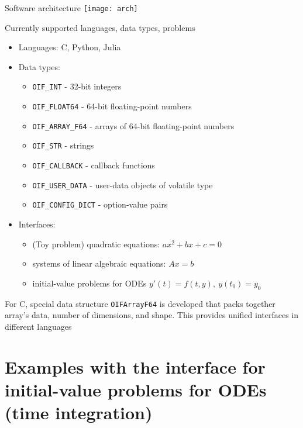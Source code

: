 \documentclass[10pt, aspectratio=169, progressbar=frametitle]{beamer}
\begin{document}
\begin{frame}{Software architecture}
  \centering
  \texttt{[image: arch]}
\end{frame}

\begin{frame}{Currently supported languages, data types, problems}
  \begin{itemize}
    \item Languages: C, Python, Julia
    \item Data types:
          \begin{itemize}
            \item \texttt{OIF\_INT} - 32-bit integers
            \item \texttt{OIF\_FLOAT64} - 64-bit floating-point numbers
            \item \texttt{OIF\_ARRAY\_F64} - arrays of 64-bit floating-point numbers
            \item \texttt{OIF\_STR} - strings
            \item \texttt{OIF\_CALLBACK} - callback functions
            \item \texttt{OIF\_USER\_DATA} - user-data objects of volatile type
            \item \texttt{OIF\_CONFIG\_DICT} - option-value pairs
          \end{itemize}
    \item Interfaces:
          \begin{itemize}
            \item (Toy problem) quadratic equations: $ax^2 + bx + c = 0$
            \item systems of linear algebraic equations: $Ax = b$
            \item initial-value problems for ODEs \(y'(t) = f(t, y), \  y(t_0) = y_0\)
          \end{itemize}
  \end{itemize}

  {\small For C, special data structure \texttt{OIFArrayF64} is developed that packs
  together array's data, number of dimensions, and shape.
  This provides unified interfaces in different languages}
\end{frame}

\section{Examples with the interface for initial-value problems for ODEs (time integration)}
\end{document}
